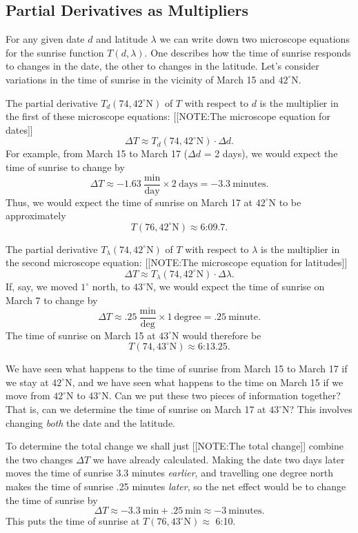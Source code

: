 \subsection{Partial Derivatives as Multipliers}
\label{subsec:partial-derivatives-as-multipliers}

	For any given date $d$ and latitude $\lambda$ we can write down two microscope equations for the sunrise function $T(d, \lambda)$.  One describes how the time of sunrise responds to changes in the date, the other to changes in the latitude.  Let's consider variations in the time of sunrise in the vicinity of March 15 and $42^\circ$N.

	The partial derivative $T_d(74,42^\circ\mbox{N})$ of $T$ with respect to $d$ is the multiplier in the first of these microscope equations:
	[[NOTE:The microscope equation for dates]]
	\[
\Delta T \approx T_d(74,42^\circ\mbox{N}) \cdot \Delta d.
\]
For example, from March 15 to March 17 ($\Delta d$ = 2 days), we would expect the time of sunrise to change by
	\[
\Delta T \approx -1.63 \ \frac{\mbox{min}}{\mbox{day}} 		\times 2 \ \mbox{days} = 
		- 3.3 \ \mbox{minutes}.
\]
Thus, we would expect the time of sunrise on March 17 at $42^\circ$N to be approximately 
	\[
T(76,42^\circ\mbox{N}) \approx \mbox{6:09.7} .
\]


	The partial derivative $T_{\lambda}(74,42^\circ\mbox{N})$ of $T$ with respect to $\lambda$ is the multiplier in the second microscope equation:
	[[NOTE:The microscope equation for latitudes]]
	\[
\Delta T \approx T_\lambda(74,42^\circ\mbox{N}) \cdot 
		\Delta \lambda.
\]
If, say, we moved $1^\circ$ north, to $43^\circ$N, we would expect the time of sunrise on March 7 to change by
	\[
\Delta T \approx .25 \ \frac{\mbox{min}}{\mbox{deg}}
		\times 1 \ \mbox{degree} 
		= .25 \ \mbox{minute}.
\] 
The time of sunrise on March 15 at $43^\circ$N would therefore be
	\[
T(74,43^\circ\mbox{N}) \approx \mbox{6:13.25}.
\]

	We have seen what happens to the time of sunrise from March 15 to March 17 if we stay at $42^\circ$N, and we have seen what happens to the time on March 15 if we move from $42^\circ$N to $43^\circ$N.  Can we put these two pieces of information together?  That is, can we determine the time of sunrise on March 17 at $43^\circ$N?  This involves changing {\em both\/} the date and the latitude.



	To determine the total change we shall just 
	[[NOTE:The total change]]
combine the two changes $\Delta T$ we have already calculated.  Making the date two days later moves the time of sunrise 3.3 minutes {\em earlier}, and travelling one degree north makes the time of sunrise .25 minutes {\em later}, so the net effect would be to change the time of sunrise by
	\[
\Delta T \approx - 3.3 \ \mbox{min} + .25 \ \mbox{min}  
	\approx  - 3 \ \mbox{minutes}.
\]
This puts the time of sunrise at $T(76,43^\circ\mbox{N}) \approx$ 6:10.

